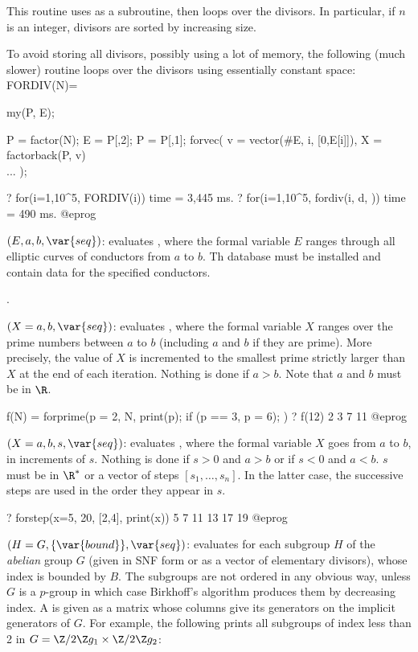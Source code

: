 This routine uses  as a subroutine, then loops over the
divisors. In particular, if $n$ is an integer, divisors are sorted by
increasing size.

To avoid storing all divisors, possibly using a lot of memory, the following
(much slower) routine loops over the divisors using essentially constant
space:
\bprog
FORDIV(N)=
{ my(P, E);

  P = factor(N); E = P[,2]; P = P[,1];
  forvec( v = vector(#E, i, [0,E[i]]),
  X = factorback(P, v)
  \\ ...
);
}
? for(i=1,10^5, FORDIV(i))
time = 3,445 ms.
? for(i=1,10^5, fordiv(i, d, ))
time = 490 ms.
@eprog

$(E,a,b,\var{seq})$: \label{se:forell}evaluates , where the formal variable $E$ ranges through all
elliptic curves of conductors from $a$ to $b$. Th  database must
be installed and contain data for the specified conductors.

.

$(X=a,b,\var{seq})$: \label{se:forprime}evaluates ,
where the formal variable $X$ ranges over the prime numbers between $a$ to
$b$ (including $a$ and $b$ if they are prime). More precisely, the value of
$X$ is incremented to the smallest prime strictly larger than $X$ at the end
of each iteration. Nothing is done if $a>b$. Note that $a$ and $b$ must be in
$\R$.

\bprog
f(N) =
{
  forprime(p = 2, N,
    print(p);
    if (p == 3, p = 6);
  )
}
? f(12)
2
3
7
11
@eprog

$(X=a,b,s,\var{seq})$: \label{se:forstep}evaluates ,
where the formal variable $X$ goes from $a$ to $b$, in increments of $s$.
Nothing is done if $s>0$ and $a>b$ or if $s<0$ and $a<b$. $s$ must be in
$\R^*$ or a vector of steps $[s_1,\dots,s_n]$. In the latter case, the
successive steps are used in the order they appear in $s$.

\bprog
? forstep(x=5, 20, [2,4], print(x))
5
7
11
13
17
19
@eprog

$(H=G,\{\var{bound}\},\var{seq})$: \label{se:forsubgroup}evaluates  for
each subgroup $H$ of the \emph{abelian} group $G$ (given in
SNF form or as a vector of elementary divisors),
whose index is bounded by $B$. The subgroups are not ordered in any
obvious way, unless $G$ is a $p$-group in which case Birkhoff's algorithm
produces them by decreasing index. A  is given as a matrix
whose columns give its generators on the implicit generators of $G$. For
example, the following prints all subgroups of index less than 2 in $G =
\Z/2\Z g_1 \times \Z/2\Z g_2$:

